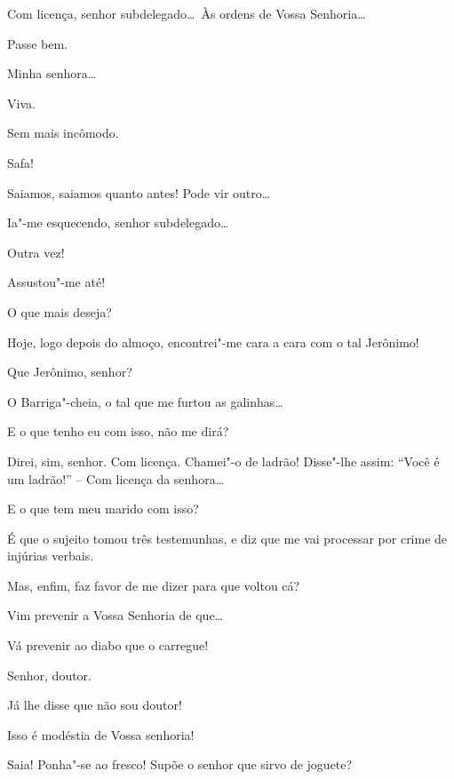  Com licença, senhor subdelegado\ldots\ Às ordens de Vossa
Senhoria\ldots

 Passe bem.

 Minha senhora\ldots

 Viva. 

 Sem mais incômodo. 

 Safa!

 Saiamos, saiamos quanto antes! Pode vir outro\ldots\ 

  Ia"-me esquecendo, senhor
subdelegado\ldots

 Outra vez!

 Assustou"-me até!

 O que mais deseja?

 Hoje, logo depois do almoço, encontrei"-me cara a cara com o
tal Jerônimo!

 Que Jerônimo, senhor?

 O Barriga"-cheia, o tal que me furtou as galinhas\ldots

 E o que tenho eu com isso, não me dirá?

 Direi, sim, senhor. Com licença.  Chamei"-o de ladrão! Disse"-lhe assim: “Você é um ladrão!” -- Com licença da senhora\ldots

 E o que tem meu marido com isso?

 É que o sujeito tomou três testemunhas, e diz que me vai
processar por crime de injúrias verbais.

 Mas, enfim, faz favor de me dizer para que voltou cá?

 Vim prevenir a Vossa Senhoria de que\ldots

 Vá prevenir ao diabo que o carregue!

  Senhor, doutor.

  Já lhe disse que não sou doutor!

  Isso é modéstia de Vossa senhoria!

 Saia! Ponha"-se ao fresco! Supõe o senhor que sirvo de joguete?

